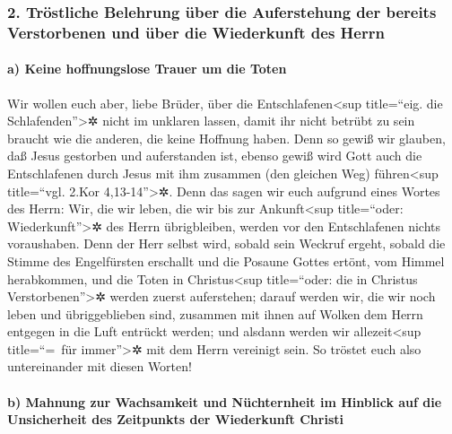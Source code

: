 \hypertarget{truxf6stliche-belehrung-uxfcber-die-auferstehung-der-bereits-verstorbenen-und-uxfcber-die-wiederkunft-des-herrn}{%
\subsubsection{2. Tröstliche Belehrung über die Auferstehung der bereits
Verstorbenen und über die Wiederkunft des
Herrn}\label{truxf6stliche-belehrung-uxfcber-die-auferstehung-der-bereits-verstorbenen-und-uxfcber-die-wiederkunft-des-herrn}}

\hypertarget{a-keine-hoffnungslose-trauer-um-die-toten}{%
\paragraph{a) Keine hoffnungslose Trauer um die
Toten}\label{a-keine-hoffnungslose-trauer-um-die-toten}}

 Wir wollen euch aber, liebe Brüder, über die
Entschlafenen\textless sup title=``eig. die Schlafenden''\textgreater✲
nicht im unklaren lassen, damit ihr nicht betrübt zu sein braucht wie
die anderen, die keine Hoffnung haben.  Denn so gewiß wir
glauben, daß Jesus gestorben und auferstanden ist, ebenso gewiß wird
Gott auch die Entschlafenen durch Jesus mit ihm zusammen (den gleichen
Weg) führen\textless sup title=``vgl. 2.Kor 4,13-14''\textgreater✲.
 Denn das sagen wir euch aufgrund eines Wortes des Herrn:
Wir, die wir leben, die wir bis zur Ankunft\textless sup title=``oder:
Wiederkunft''\textgreater✲ des Herrn übrigbleiben, werden vor den
Entschlafenen nichts voraushaben.  Denn der Herr selbst
wird, sobald sein Weckruf ergeht, sobald die Stimme des Engelfürsten
erschallt und die Posaune Gottes ertönt, vom Himmel herabkommen, und die
Toten in Christus\textless sup title=``oder: die in Christus
Verstorbenen''\textgreater✲ werden zuerst auferstehen; 
darauf werden wir, die wir noch leben und übriggeblieben sind, zusammen
mit ihnen auf Wolken dem Herrn entgegen in die Luft entrückt werden; und
alsdann werden wir allezeit\textless sup title=``=~für
immer''\textgreater✲ mit dem Herrn vereinigt sein.  So
tröstet euch also untereinander mit diesen Worten!

\hypertarget{b-mahnung-zur-wachsamkeit-und-nuxfcchternheit-im-hinblick-auf-die-unsicherheit-des-zeitpunkts-der-wiederkunft-christi}{%
\paragraph{b) Mahnung zur Wachsamkeit und Nüchternheit im Hinblick auf
die Unsicherheit des Zeitpunkts der Wiederkunft
Christi}\label{b-mahnung-zur-wachsamkeit-und-nuxfcchternheit-im-hinblick-auf-die-unsicherheit-des-zeitpunkts-der-wiederkunft-christi}}

